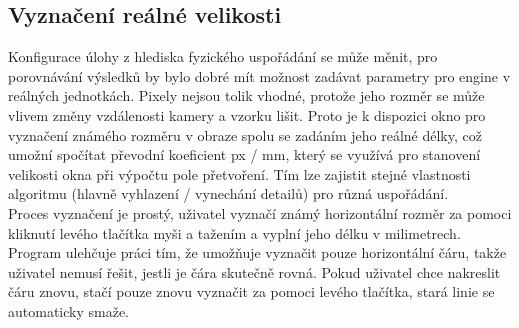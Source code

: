 \documentclass[a4paper,12pt]{article}
\begin{document}
\subsection{Vyznačení reálné velikosti}
\begin{figure}[H]
\end{figure}
Konfigurace úlohy z hlediska fyzického uspořádání se může měnit, pro porovnávání výsledků by bylo dobré mít možnost zadávat parametry pro engine v reálných jednotkách. Pixely nejsou tolik vhodné, protože jeho rozměr se může vlivem změny vzdálenosti kamery a vzorku lišit. Proto je k dispozici okno pro vyznačení známého rozměru v obraze spolu se zadáním jeho reálné délky, což umožní spočítat převodní koeficient px / mm, který se využívá pro stanovení velikosti okna při výpočtu pole přetvoření. Tím lze zajistit stejné vlastnosti algoritmu (hlavně vyhlazení / vynechání detailů) pro různá uspořádání.\\
Proces vyznačení je prostý, uživatel vyznačí známý horizontální rozměr za pomoci kliknutí levého tlačítka myši a tažením a vyplní jeho délku v milimetrech. Program ulehčuje práci tím, že umožňuje vyznačit pouze horizontální čáru, takže uživatel nemusí řešit, jestli je čára skutečně rovná. Pokud uživatel chce nakreslit čáru znovu, stačí pouze znovu vyznačit za pomoci levého tlačítka, stará linie se automaticky smaže.
\end{document}
